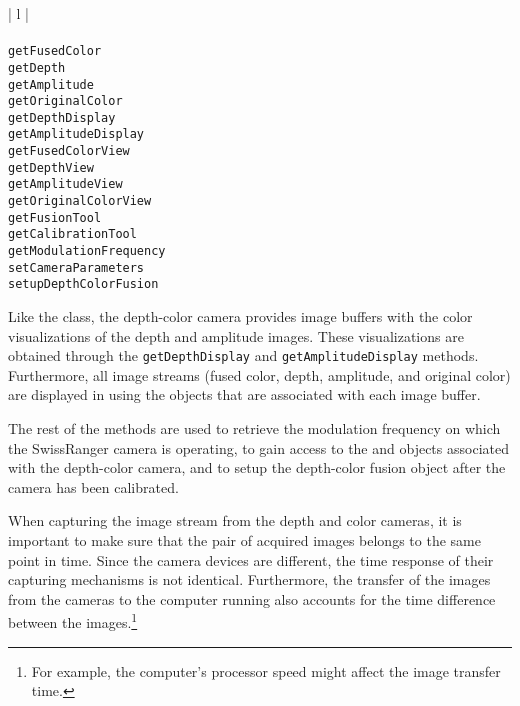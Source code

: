 \begin{table}[ht]
\caption{Public methods in the \DepthColorCam{} class}
\begin{center}
\begin{tabular}{| l |}
	\hline 
	 \\
	 \\
	\hline \hline
	\texttt{getFusedColor} \\
	\texttt{getDepth} \\
	\texttt{getAmplitude} \\
	\texttt{getOriginalColor} \\
	\texttt{getDepthDisplay} \\
	\texttt{getAmplitudeDisplay} \\
	\texttt{getFusedColorView} \\
	\texttt{getDepthView} \\
	\texttt{getAmplitudeView} \\
	\texttt{getOriginalColorView} \\
	\texttt{getFusionTool} \\
	\texttt{getCalibrationTool} \\
	\texttt{getModulationFrequency} \\
	\texttt{setCameraParameters} \\
	\texttt{setupDepthColorFusion} \\
	\hline
\end{tabular}
\end{center}
\label{depthcolorcammethods}
\end{table}

Like the \SwissRangerCam{} class, the depth-color camera provides image buffers with the color
visualizations of the depth and amplitude images. These visualizations are obtained through the 
\texttt{get\-Depth\-Dis\-play} and \texttt{get\-Am\-pli\-tude\-Dis\-play} methods. Furthermore, all image streams
(fused color, depth, amplitude, and original color) are displayed in \RD{} using the \ImageView{} objects that 
are associated with each image buffer.

The rest of the methods are used to retrieve the modulation frequency on which the SwissRanger camera is
operating, to gain access to the \DepthColorCalibrationTool{} and \DepthColorFusion{} objects associated
with the depth-color camera, and to setup the depth-color fusion object after the camera has been calibrated. 

When capturing the image stream from the depth and color cameras, it is important to make sure that the
pair of acquired images belongs to the same point in time. Since the camera devices are different, the time
response of their capturing mechanisms is not identical. Furthermore, the transfer of the images from the 
cameras to the computer running \RD{} also accounts for the time difference between the 
images.\footnote{For example, the computer's processor speed might affect the image transfer time.}


